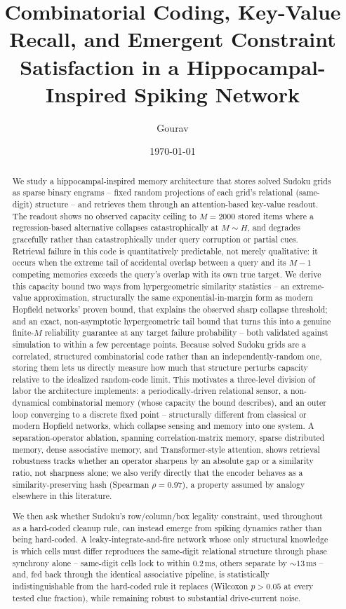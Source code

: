 \documentclass[11pt]{article}
\title{Combinatorial Coding, Key-Value Recall, and Emergent Constraint\\
Satisfaction in a Hippocampal-Inspired Spiking Network}
\author{Gourav}
\date{\today}
\begin{document}
\maketitle

\begin{abstract}
We study a hippocampal-inspired memory architecture that stores solved Sudoku grids as sparse
binary engrams -- fixed random projections of each grid's relational (same-digit) structure --
and retrieves them through an attention-based key-value readout. The readout shows no observed
capacity ceiling to $M{=}2000$ stored items where a regression-based alternative collapses
catastrophically at $M{\sim}H$, and degrades gracefully rather than catastrophically under
query corruption or partial cues. Retrieval failure in this code is quantitatively predictable,
not merely qualitative: it occurs when the extreme tail of accidental overlap between a query
and its $M{-}1$ competing memories exceeds the query's overlap with its own true target. We
derive this capacity bound two ways from hypergeometric similarity statistics -- an
extreme-value approximation, structurally the same exponential-in-margin form as modern
Hopfield networks' proven bound, that explains the observed sharp collapse threshold; and an
exact, non-asymptotic hypergeometric tail bound that turns this into a genuine finite-$M$
reliability guarantee at any target failure probability -- both validated against simulation to
within a few percentage points. Because solved Sudoku grids are a correlated, structured
combinatorial code rather than an independently-random one, storing them lets us directly
measure how much that structure perturbs capacity relative to the idealized random-code limit.
This motivates a three-level division of labor the architecture implements: a periodically-driven
relational sensor, a non-dynamical combinatorial memory (whose capacity the bound describes),
and an outer loop converging to a discrete fixed point -- structurally different from classical
or modern Hopfield networks, which collapse sensing and memory into one system. A
separation-operator ablation, spanning correlation-matrix memory, sparse distributed memory,
dense associative memory, and Transformer-style attention, shows retrieval robustness tracks
whether an operator sharpens by an absolute gap or a similarity ratio, not sharpness alone; we
also verify directly that the encoder behaves as a similarity-preserving hash (Spearman
$\rho{=}0.97$), a property assumed by analogy elsewhere in this literature.

We then ask whether Sudoku's row/column/box legality constraint, used throughout as a
hard-coded cleanup rule, can instead emerge from spiking dynamics rather than being
hard-coded. A leaky-integrate-and-fire network whose only structural knowledge is which cells
must differ reproduces the same-digit relational structure through phase synchrony alone --
same-digit cells lock to within $0.2$\,ms, others separate by ${\sim}13$\,ms -- and, fed back
through the identical associative pipeline, is statistically indistinguishable from the
hard-coded rule it replaces (Wilcoxon $p{>}0.05$ at every tested clue fraction), while
remaining robust to substantial drive-current noise.


\end{abstract}
\end{document}
